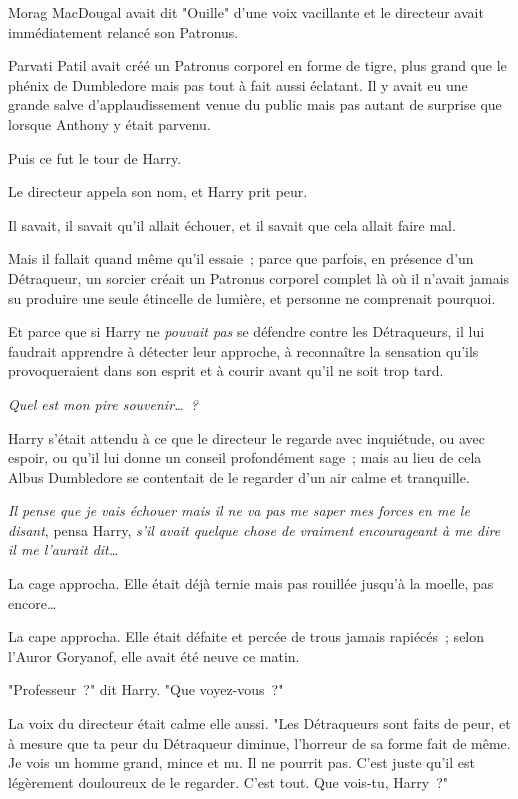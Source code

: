 \later

Morag MacDougal avait dit "Ouille" d'une voix vacillante et le directeur avait immédiatement relancé son Patronus.

Parvati Patil avait créé un Patronus corporel en forme de tigre, plus grand que le phénix de Dumbledore mais pas tout à fait aussi éclatant. Il y avait eu une grande salve d'applaudissement venue du public mais pas autant de surprise que lorsque Anthony y était parvenu.

Puis ce fut le tour de Harry.

Le directeur appela son nom, et Harry prit peur.

Il savait, il savait qu'il allait échouer, et il savait que cela allait faire mal.

Mais il fallait quand même qu'il essaie~; parce que parfois, en présence d'un Détraqueur, un sorcier créait un Patronus corporel complet là où il n'avait jamais su produire une seule étincelle de lumière, et personne ne comprenait pourquoi.

Et parce que si Harry ne \emph{pouvait pas} se défendre contre les Détraqueurs, il lui faudrait apprendre à détecter leur approche, à reconnaître la sensation qu'ils provoqueraient dans son esprit et à courir avant qu'il ne soit trop tard.

\emph{Quel est mon pire souvenir…~?}

Harry s'était attendu à ce que le directeur le regarde avec inquiétude, ou avec espoir, ou qu'il lui donne un conseil profondément sage~; mais au lieu de cela Albus Dumbledore se contentait de le regarder d'un air calme et tranquille.

\emph{Il pense que je vais échouer mais il ne va pas me saper mes forces en me le disant}, pensa Harry, \emph{s'il avait quelque chose de vraiment encourageant à me dire il me l'aurait dit…}

La cage approcha. Elle était déjà ternie mais pas rouillée jusqu'à la moelle, pas encore…

La cape approcha. Elle était défaite et percée de trous jamais rapiécés~; selon l'Auror Goryanof, elle avait été neuve ce matin.

"Professeur~?" dit Harry. "Que voyez-vous~?"

La voix du directeur était calme elle aussi. "Les Détraqueurs sont faits de peur, et à mesure que ta peur du Détraqueur diminue, l'horreur de sa forme fait de même. Je vois un homme grand, mince et nu. Il ne pourrit pas. C'est juste qu'il est légèrement douloureux de le regarder. C'est tout. Que vois-tu, Harry~?"

